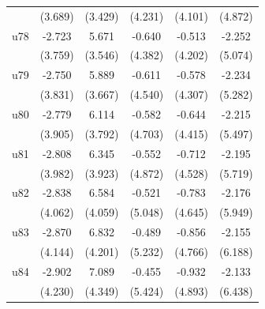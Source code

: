 \begin{table}[htbp]
\begin{tabular}{l*{5}{c}}
                    &     (3.689)         &     (3.429)         &     (4.231)         &     (4.101)         &     (4.872)         \\
\addlinespace
u78                 &      -2.723         &       5.671         &      -0.640         &      -0.513         &      -2.252         \\
                    &     (3.759)         &     (3.546)         &     (4.382)         &     (4.202)         &     (5.074)         \\
\addlinespace
u79                 &      -2.750         &       5.889         &      -0.611         &      -0.578         &      -2.234         \\
                    &     (3.831)         &     (3.667)         &     (4.540)         &     (4.307)         &     (5.282)         \\
\addlinespace
u80                 &      -2.779         &       6.114         &      -0.582         &      -0.644         &      -2.215         \\
                    &     (3.905)         &     (3.792)         &     (4.703)         &     (4.415)         &     (5.497)         \\
\addlinespace
u81                 &      -2.808         &       6.345         &      -0.552         &      -0.712         &      -2.195         \\
                    &     (3.982)         &     (3.923)         &     (4.872)         &     (4.528)         &     (5.719)         \\
\addlinespace
u82                 &      -2.838         &       6.584         &      -0.521         &      -0.783         &      -2.176         \\
                    &     (4.062)         &     (4.059)         &     (5.048)         &     (4.645)         &     (5.949)         \\
\addlinespace
u83                 &      -2.870         &       6.832         &      -0.489         &      -0.856         &      -2.155         \\
                    &     (4.144)         &     (4.201)         &     (5.232)         &     (4.766)         &     (6.188)         \\
\addlinespace
u84                 &      -2.902         &       7.089         &      -0.455         &      -0.932         &      -2.133         \\
                    &     (4.230)         &     (4.349)         &     (5.424)         &     (4.893)         &     (6.438)         \\

\end{tabular}
\end{table}

